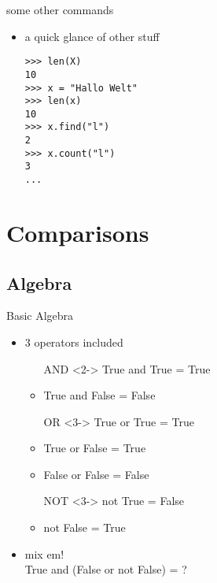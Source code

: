\documentclass[handout]{beamer}
\begin{document}
		\begin{frame}[fragile]{some other commands}
			\begin{itemize}
                \item<1-> a quick glance of other stuff
\begin{lstlisting}
>>> len(X)
10
>>> x = "Hallo Welt"
>>> len(x)
10
>>> x.find("l")
2
>>> x.count("l")
3
...
\end{lstlisting}
            \end{itemize}
		\end{frame}
\section{Comparisons}
    \subsection{Algebra}
		\begin{frame}{Basic Algebra}
			\begin{itemize}
                \item<1-> 3 operators included
                \begin{itemize}
                    \item[AND]<2-> True and True = True
                    \item<2-> True and False = False
                    \item[OR]<3-> True or True = True
                    \item<3-> True or False = True
                    \item<3-> False or False = False
                    \item[NOT]<3-> not True = False
                    \item<3-> not False = True
                \end{itemize}
                \item<4-> mix em! \\
                        True and (False or not False) = ?
            \end{itemize}
        \end{frame}    
\end{document}
